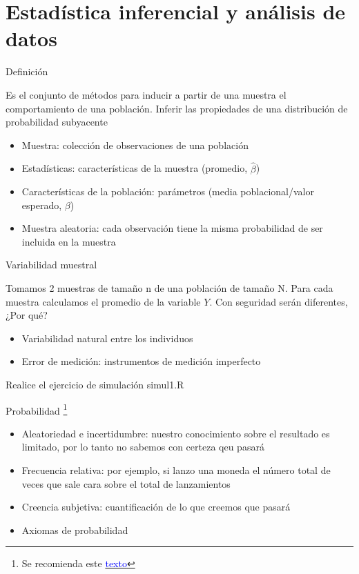 \documentclass{beamer}
\begin{document}
\section{Estadística inferencial y análisis de datos}

\begin{frame}{Definición}

Es el conjunto de métodos para inducir a partir de una muestra el comportamiento de una población. Inferir las propiedades de una distribución de probabilidad subyacente

\begin{itemize}
    \item Muestra: colección de observaciones de una población
    \item Estadísticas: características de la muestra (promedio, $\hat{\beta}$)
    \item Características de la población: parámetros (media poblacional/valor esperado, $\beta$)
    \item Muestra aleatoria: cada observación tiene la misma probabilidad de ser incluida en la muestra
\end{itemize}
    
\end{frame}

\begin{frame}{Variabilidad muestral}

Tomamos 2 muestras de tamaño n de una población de tamaño N. Para cada muestra calculamos el promedio de la variable $Y$. Con seguridad serán diferentes, ¿Por qué?

\begin{itemize}
    \item Variabilidad natural entre los individuos
    \item Error de medición: instrumentos de medición imperfecto
\end{itemize}

    Realice el ejercicio de simulación simul1.R
\end{frame}

\begin{frame}{Probabilidad \footnote{Se recomienda este \href{https://www.probabilitycourse.com/chapter1/1_1_0_what_is_probability.php}{\textcolor{blue}{texto}}}}

\begin{itemize}
    \item Aleatoriedad e incertidumbre: nuestro conocimiento sobre el resultado es limitado, por lo tanto no sabemos con certeza qeu pasará
    \item Frecuencia relativa: por ejemplo, si lanzo una moneda el número total de veces que sale cara sobre el total de lanzamientos
    \item Creencia subjetiva: cuantificación de lo que creemos que pasará
    \item Axiomas de probabilidad
\end{itemize}
    
\end{frame}
\end{document}

